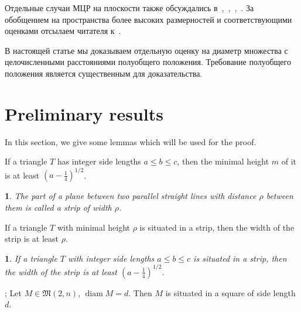 \documentclass[11pt,twoside,draft
]{article}
\newtheorem{Definition}{\indent {\sc Definition}}
\newtheorem{Corollary}{\indent {\sc Corollary}}
\begin{document}
Отдельные случаи МЦР на плоскости также обсуждались
в~\cite[\S 5.11]{brass2006research},~\cite[\S D20]{guy2013unsolved},~\cite{our-pmm-2018},~\cite{our-ped-2018}.
За обобщением на пространства более высоких размерностей и соответствующими оценками
отсылаем читателя к~\cite{kurz2005characteristic,nozaki2013lower}.

В настоящей статье мы доказываем отдельную оценку на диаметр множества с целочисленными расстояниями полуобщего положения.
Требование полуобщего положения является существенным для доказательства.



\section{Preliminary results}

In this section, we give some lemmas which will be used for the proof.


\begin{lemma}
	\cite[Observation 1]{solymosi2003note}
	If a triangle $T$ has integer side lengths $a \leq b \leq c$,
	then the minimal height $m$ of it is at least $\left(a - \frac{1}{4}\right)^{1/2}$.
\end{lemma}

\begin{Definition}
	The part of a plane between two parallel straight lines with distance $\rho$ between them
	is called a strip of width $\rho$.
\end{Definition}

\begin{lemma}
	\cite{smurov1998stripcoverings}
	If a triangle $T$ with minimal height $\rho$ is situated in a strip,
	then the width of the strip is at least $\rho$.
\end{lemma}

\begin{Corollary}
	\label{cor:solymosi_strip}
	If a triangle $T$ with integer side lengths $a \leq b \leq c$ is situated in a strip,
	then the width of the strip is at least $\left(a - \frac{1}{4}\right)^{1/2}$.
\end{Corollary}


\begin{lemma}
	\cite[Lemma 4]{our-vmmsh-2018};
	\cite[Lemma 2.4]{my-pps-linear-bound-2019}
	\label{lem:square_container}
	Let $M\in\mathfrak{M}(2,n)$, $\operatorname{diam} M = d$.
	Then $M$ is situated in a square of side length $d$.
\end{lemma}
\end{document}
